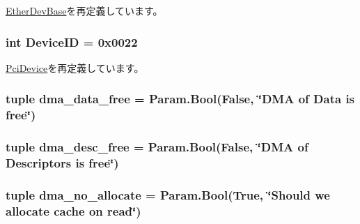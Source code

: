 \hyperlink{classEthernet_1_1EtherDevBase_a17da7064bc5c518791f0c891eff05fda}{EtherDevBase}を再定義しています。\hypertarget{classEthernet_1_1NSGigE_a4a8ed9a0233fc6d0ce178569c4de25d0}{
\subsubsection[{DeviceID}]{\setlength{\rightskip}{0pt plus 5cm}int {\bf DeviceID} = 0x0022}}
\label{classEthernet_1_1NSGigE_a4a8ed9a0233fc6d0ce178569c4de25d0}


\hyperlink{classPci_1_1PciDevice_aa90d1ebfb6ac8c64983451e2196e342f}{PciDevice}を再定義しています。\hypertarget{classEthernet_1_1NSGigE_a22d1e790e1b7e65c12b7fdea7a31ea68}{
\subsubsection[{dma\_\-data\_\-free}]{\setlength{\rightskip}{0pt plus 5cm}tuple {\bf dma\_\-data\_\-free} = Param.Bool(False, \char`\"{}DMA of Data is free\char`\"{})}}
\label{classEthernet_1_1NSGigE_a22d1e790e1b7e65c12b7fdea7a31ea68}
\hypertarget{classEthernet_1_1NSGigE_a6e202d51fe3c62be48597da296a25c5b}{
\subsubsection[{dma\_\-desc\_\-free}]{\setlength{\rightskip}{0pt plus 5cm}tuple {\bf dma\_\-desc\_\-free} = Param.Bool(False, \char`\"{}DMA of Descriptors is free\char`\"{})}}
\label{classEthernet_1_1NSGigE_a6e202d51fe3c62be48597da296a25c5b}
\hypertarget{classEthernet_1_1NSGigE_affae8158ec5ad5cadc42f91e14f2b920}{
\subsubsection[{dma\_\-no\_\-allocate}]{\setlength{\rightskip}{0pt plus 5cm}tuple {\bf dma\_\-no\_\-allocate} = Param.Bool(True, \char`\"{}Should we allocate cache on read\char`\"{})}}
